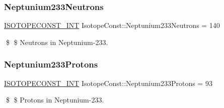 \subsubsection{\texorpdfstring{Neptunium233\+Neutrons}{Neptunium233Neutrons}}
{\footnotesize\ttfamily \mbox{\hyperlink{group___isotope_const-_macros_ga5f18360b3e99483a35c32d789e62621c}{I\+S\+O\+T\+O\+P\+E\+C\+O\+N\+S\+T\+\_\+\+I\+NT}} Isotope\+Const\+::\+Neptunium233\+Neutrons = 140}

\$ \$ Neutrons in Neptunium-\/233. \mbox{\label{group___isotope_const-_neptunium-_np233_ga35f4cd8ae21186d6b6694f5e289f0a17}} 
\subsubsection{\texorpdfstring{Neptunium233\+Protons}{Neptunium233Protons}}
{\footnotesize\ttfamily \mbox{\hyperlink{group___isotope_const-_macros_ga5f18360b3e99483a35c32d789e62621c}{I\+S\+O\+T\+O\+P\+E\+C\+O\+N\+S\+T\+\_\+\+I\+NT}} Isotope\+Const\+::\+Neptunium233\+Protons = 93}

\$ \$ Protons in Neptunium-\/233. 